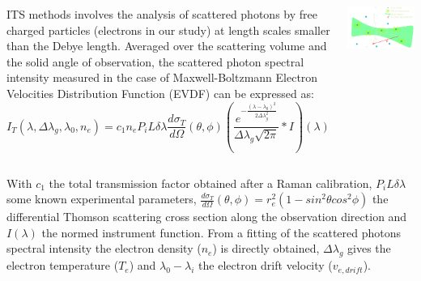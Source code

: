 \documentclass{beamer}
\begin{document}
\begin{frame}[t]
\begin{tcbposter}
{\begin{columns}
	\begin{column}{0.45\paperwidth}
    ITS methods involves the analysis of scattered photons by free charged particles (electrons in our study) at length scales smaller than the Debye length. Averaged over the scattering volume and the solid angle of observation, the scattered photon spectral intensity measured in the case of Maxwell-Boltzmann Electron Velocities Distribution Function (EVDF) can be expressed as:
    \begin{equation}
		I_{T}(\lambda,\Delta \lambda_{g}, \lambda_{0},n_{e})=c_{1}n_{e} P_{i}L\delta \lambda \frac{d \sigma_{T}}{d \Omega}(\theta, \phi) \left( \frac{e^{- \frac{(\lambda-\lambda_{0})^{2}}{2 \Delta \lambda_{g}^{2}}}}{\Delta \lambda_{g} \sqrt{2 \pi}} \ast I \right) (\lambda)     
	\end{equation}
    \end{column}

    \begin{column}{0.2\paperwidth}
    \vspace*{-0.02\paperwidth}
    \includegraphics[width=0.2\paperwidth]{Scattering_Configuration_angles_bright.pdf}
    \end{column}
\end{columns}
	With $c_{1}$ the total transmission factor obtained after a Raman calibration, $P_{i} L \delta \lambda$ some known experimental parameters,  $\frac{d \sigma_{T}}{d \Omega}(\theta, \phi)= r_{e}^{2}(1-sin^{2}\theta cos^{2} \phi)$ the differential Thomson scattering cross section along the observation direction and $I(\lambda)$ the normed instrument function. From a fitting of the scattered photons spectral intensity  the electron density ($n_{e}$) is directly obtained, $\Delta \lambda_{g}$ gives the electron temperature ($T_{e}$) and $\lambda_{0}-\lambda_{i}$ the electron drift velocity ($v_{e,drift}$).
    
}
\end{tcbposter}
\end{frame}
\end{document}
